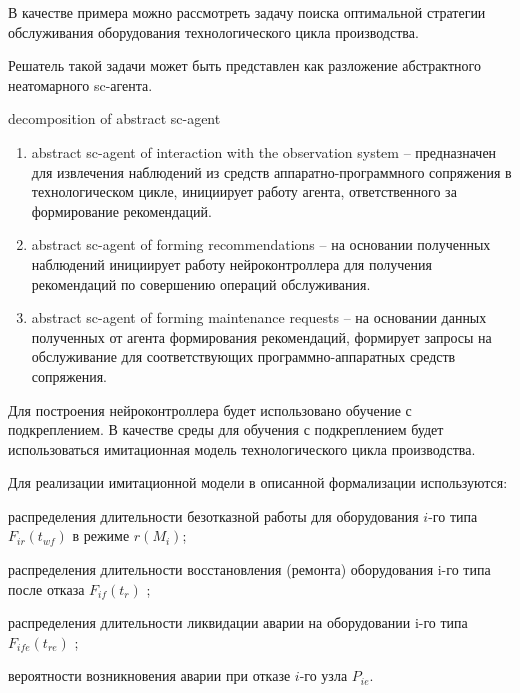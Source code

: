 В качестве примера можно рассмотреть задачу поиска оптимальной стратегии обслуживания оборудования технологического цикла производства.

Решатель такой задачи может быть представлен как разложение абстрактного неатомарного sc-агента.

\begin{SCn}
\begin{scnrelfromset}{decomposition of abstract sc-agent}
\end{scnrelfromset}
\end{SCn}

\begin{enumerate}
    \item abstract sc-agent of interaction with the observation system – предназначен для извлечения наблюдений из средств аппаратно-программного сопряжения в технологическом цикле, инициирует работу агента, ответственного за формирование рекомендаций.
    \item abstract sc-agent of forming recommendations – на основании полученных наблюдений инициирует работу нейроконтроллера для получения рекомендаций по совершению операций обслуживания.
    \item abstract sc-agent of forming maintenance requests – на основании данных полученных от агента формирования рекомендаций, формирует запросы на обслуживание для соответствующих программно-аппаратных средств сопряжения.

\end{enumerate}

Для построения нейроконтроллера будет использовано обучение с подкреплением. В качестве среды для обучения с подкреплением будет использоваться имитационная модель технологического цикла производства.

Для реализации имитационной модели в описанной формализации используются:



\begin{textitemize}
    \item распределения длительности безотказной работы для оборудования $i$-го типа $F_{ir} (t_{wf})$  в режиме $r(M_i)$;
    \item распределения длительности восстановления (ремонта) оборудования i-го типа после отказа $F_{if}(t_r)$ ;
    \item распределения длительности ликвидации аварии на оборудовании i-го типа $F_{ife}(t_{re})$  ;
    \item вероятности возникновения аварии при отказе $i$-го узла $P_{ie}$.
\end{textitemize}


